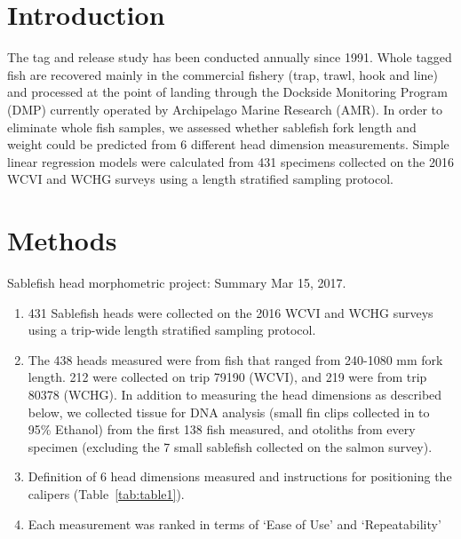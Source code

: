 \documentclass[12pt]{article}\usepackage[]{graphicx}\usepackage[]{color}
\begin{document}

\frontmatter


\renewcommand{\headrulewidth}{0.5pt}  %
\renewcommand{\footrulewidth}{0.5pt}  %

\hypertarget{introduction}{%
\section{Introduction}\label{introduction}}

The tag and release study has been conducted annually since 1991. Whole tagged fish are recovered mainly in the commercial fishery (trap, trawl, hook and line) and processed at the point of landing through the Dockside Monitoring Program (DMP) currently operated by Archipelago Marine Research (AMR). In order to eliminate whole fish samples, we assessed whether sablefish fork length and weight could be predicted from 6 different head dimension measurements. Simple linear regression models were calculated from 431 specimens collected on the 2016 WCVI and WCHG surveys using a length stratified sampling protocol.

\hypertarget{methods}{%
\section{Methods}\label{methods}}

Sablefish head morphometric project: Summary Mar 15, 2017.
\begin{enumerate}
\def\labelenumi{\arabic{enumi}.}
\item
  431 Sablefish heads were collected on the 2016 WCVI and WCHG surveys using a trip-wide length stratified sampling protocol.
\item
  The 438 heads measured were from fish that ranged from 240-1080 mm fork length. 212 were collected on trip 79190 (WCVI), and 219 were from trip 80378 (WCHG). In addition to measuring the head dimensions as described below, we collected tissue for DNA analysis (small fin clips collected in to 95\% Ethanol) from the first 138 fish measured, and otoliths from every specimen (excluding the 7 small sablefish collected on the salmon survey).
\item
  Definition of 6 head dimensions measured and instructions for positioning the calipers (Table~\ref{tab:table1}).
\item
  Each measurement was ranked in terms of `Ease of Use' and `Repeatability'
\end{enumerate}
\clearpage
\end{document}
